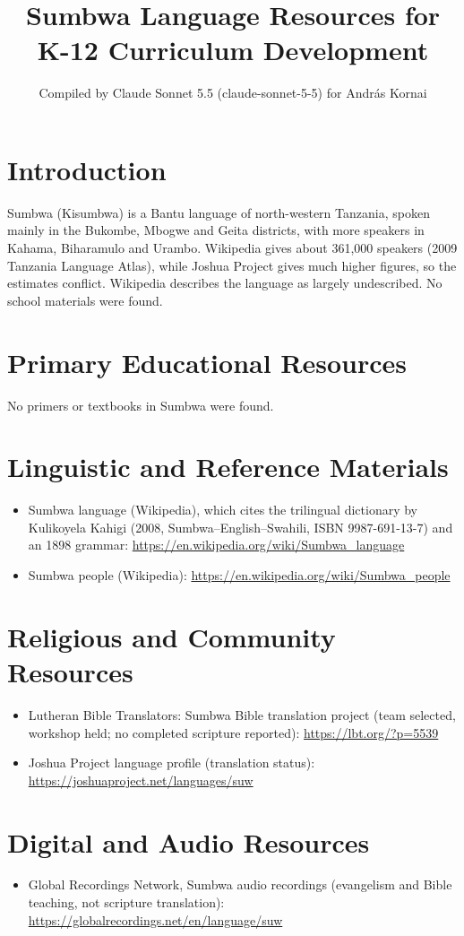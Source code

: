 \documentclass[12pt]{article}
\title{Sumbwa Language Resources for K-12 Curriculum Development}
\author{Compiled by Claude Sonnet 5.5 (claude-sonnet-5-5) for Andr\'as Kornai}
\date{}
\begin{document}
\maketitle

\section{Introduction}
Sumbwa (Kisumbwa) is a Bantu language of north-western Tanzania, spoken mainly in the Bukombe, Mbogwe and Geita districts, with more speakers in Kahama, Biharamulo and Urambo. Wikipedia gives about 361,000 speakers (2009 Tanzania Language Atlas), while Joshua Project gives much higher figures, so the estimates conflict. Wikipedia describes the language as largely undescribed. No school materials were found.

\section{Primary Educational Resources}
No primers or textbooks in Sumbwa were found.

\section{Linguistic and Reference Materials}
\begin{itemize}
\item Sumbwa language (Wikipedia), which cites the trilingual dictionary by Kulikoyela Kahigi (2008, Sumbwa--English--Swahili, ISBN 9987-691-13-7) and an 1898 grammar: \url{https://en.wikipedia.org/wiki/Sumbwa_language}
\item Sumbwa people (Wikipedia): \url{https://en.wikipedia.org/wiki/Sumbwa_people}
\end{itemize}

\section{Religious and Community Resources}
\begin{itemize}
\item Lutheran Bible Translators: Sumbwa Bible translation project (team selected, workshop held; no completed scripture reported): \url{https://lbt.org/?p=5539}
\item Joshua Project language profile (translation status): \url{https://joshuaproject.net/languages/suw}
\end{itemize}

\section{Digital and Audio Resources}
\begin{itemize}
\item Global Recordings Network, Sumbwa audio recordings (evangelism and Bible teaching, not scripture translation): \url{https://globalrecordings.net/en/language/suw}
\end{itemize}
\end{document}
